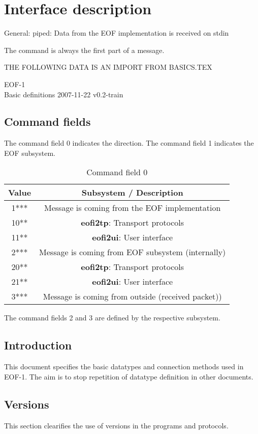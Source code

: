 \documentclass[12pt,a4paper]{book}
\begin{document}
\section{Interface description}
General: piped:
Data from the EOF implementation is received on stdin 

The command is always the first part of a message.

THE FOLLOWING DATA IS AN IMPORT FROM BASICS.TEX

EOF-1\\Basic definitions
2007-11-22 v0.2-train
\subsection{Command fields}
The command field 0 indicates the direction.
The command field 1 indicates the EOF subsystem.
\begin{longtable}{|c|c|}
\caption{Command field 0}\\
\hline
\textbf{Value} & \textbf{Subsystem} / \textbf{Description}\\
\hline
1*** & Message is coming from the EOF implementation\\
\hline
10** & \textbf{eofi2tp}: Transport protocols\\
\hline
11** & \textbf{eofi2ui}: User interface\\
\hline
2*** & Message is coming from EOF subsystem (internally)\\
\hline
20** & \textbf{eofi2tp}: Transport protocols\\
\hline
21** & \textbf{eofi2ui}: User interface\\
\hline
3*** & Message is coming from outside (received packet))\\
\hline
\end{longtable}
The command fields 2 and 3 are defined by the respective subsystem.
\subsection{Introduction}
This document specifies the basic datatypes and connection
methods used in EOF-1. The aim is to stop repetition of
datatype definition in other documents.

\subsection{Versions}
This section clearifies the use of versions in the programs and protocols.
\end{document}
